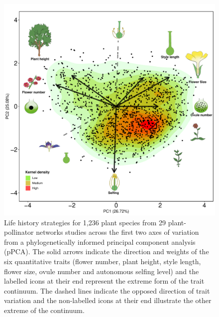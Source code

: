 \documentclass[12pt,a4paper,]{article}
\begin{document}
\begin{figure}
\centering
\includegraphics{output/figures/unnamed-chunk-4-1.pdf}
\caption{\label{fig:unnamed-chunk-4}Life history strategies for 1,236 plant
species from 29 plant-pollinator networks studies across the first two
axes of variation from a phylogenetically informed principal component
analysis (pPCA). The solid arrows indicate the direction and weights of
the six quantitative traits (flower number, plant height, style length,
flower size, ovule number and autonomous selfing level) and the labelled
icons at their end represent the extreme form of the trait continuum.
The dashed lines indicate the opposed direction of trait variation and
the non-labelled icons at their end illustrate the other extreme of the
continuum.}
\end{figure}
\end{document}
